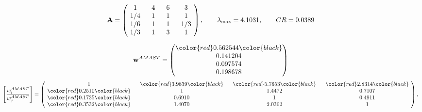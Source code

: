 \begin{example}
\begin{equation*}
\mathbf{A} =
\begin{pmatrix}
$\,\,$ 1 $\,\,$ & $\,\,$4$\,\,$ & $\,\,$6$\,\,$ & $\,\,$3 $\,\,$ \\
$\,\,$ 1/4$\,\,$ & $\,\,$ 1 $\,\,$ & $\,\,$1$\,\,$ & $\,\,$1 $\,\,$ \\
$\,\,$ 1/6$\,\,$ & $\,\,$ 1 $\,\,$ & $\,\,$ 1 $\,\,$ & $\,\,$ 1/3 $\,\,$ \\
$\,\,$ 1/3$\,\,$ & $\,\,$ 1 $\,\,$ & $\,\,$3$\,\,$ & $\,\,$ 1  $\,\,$ \\
\end{pmatrix},
\qquad
\lambda_{\max} =
4.1031,
\qquad
CR = 0.0389
\end{equation*}

\begin{equation*}
\mathbf{w}^{AMAST} =
\begin{pmatrix}
\color{red} 0.562544\color{black} \\
0.141204\\
0.097574\\
0.198678
\end{pmatrix}\end{equation*}
\begin{equation*}
\left[ \frac{{w}^{AMAST}_i}{{w}^{AMAST}_j} \right] =
\begin{pmatrix}
$\,\,$ 1 $\,\,$ & $\,\,$\color{red} 3.9839\color{black} $\,\,$ & $\,\,$\color{red} 5.7653\color{black} $\,\,$ & $\,\,$\color{red} 2.8314\color{black} $\,\,$ \\
$\,\,$\color{red} 0.2510\color{black} $\,\,$ & $\,\,$ 1 $\,\,$ & $\,\,$1.4472$\,\,$ & $\,\,$0.7107  $\,\,$ \\
$\,\,$\color{red} 0.1735\color{black} $\,\,$ & $\,\,$0.6910$\,\,$ & $\,\,$ 1 $\,\,$ & $\,\,$0.4911 $\,\,$ \\
$\,\,$\color{red} 0.3532\color{black} $\,\,$ & $\,\,$1.4070$\,\,$ & $\,\,$2.0362$\,\,$ & $\,\,$ 1  $\,\,$ \\
\end{pmatrix},
\end{equation*}


\end{example}
